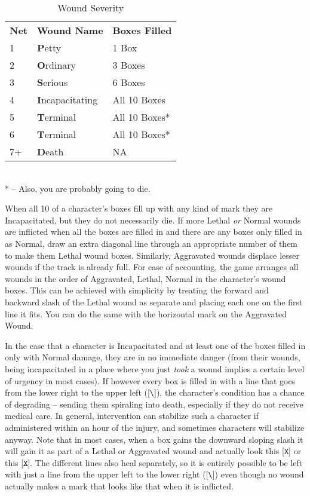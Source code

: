 \begin{wraptable}[11]{R}{8cm} \vspace{-.6cm}
 \caption{Wound Severity} \centering
\begin{tabular}{l l l}
\textbf{Net} & \textbf{Wound Name} & \textbf{Boxes Filled}\\
1 &\textbf{P}etty & 1 Box\\
2 &\textbf{O}rdinary & 3 Boxes\\
3 &\textbf{S}erious & 6 Boxes\\
4 &\textbf{I}ncapacitating & All 10 Boxes\\
5 &\textbf{T}erminal & All 10 Boxes*\\
6 &\textbf{T}erminal & All 10 Boxes*\\
7+ &\textbf{D}eath& NA\\
\end{tabular}\\
* -- Also, you are probably going to die.
\end{wraptable}

When all 10 of a character's boxes fill up with any kind of mark they are Incapacitated, but they do not necessarily die. If more Lethal \textit{or} Normal wounds are inflicted when all the boxes are filled in and there are any boxes only filled in as Normal, draw an extra diagonal line through an appropriate number of them to make them Lethal wound boxes. Similarly, Aggravated wounds displace lesser wounds if the track is already full. For ease of accounting, the game arranges all wounds in the order of Aggravated, Lethal, Normal in the character's wound boxes. This can be achieved with simplicity by treating the forward and backward slash of the Lethal wound as separate and placing each one on the first line it fits. You can do the same with the horizontal mark on the Aggravated Wound.

In the case that a character is Incapacitated and at least one of the boxes filled in only with Normal damage, they are in no immediate danger (from their wounds, being incapacitated in a place where you just \textit{took} a wound implies a certain level of urgency in most cases). If however every box is filled in with a line that goes from the lower right to the upper left ([\texttt{\textbackslash}]), the character's condition has a chance of degrading -- sending them spiraling into death, especially if they do not receive medical care. In general, intervention can stabilize such a character if administered within an hour of the injury, and sometimes characters will stabilize anyway. Note that in most cases, when a box gains the downward sloping slash it will gain it as part of a Lethal or Aggravated wound and actually look this [\texttt{X}] or this [\texttt{\sout{X}}]. The different lines also heal separately, so it is entirely possible to be left with just a line from the upper left to the lower right ([\texttt{\textbackslash}]) even though no wound actually makes a mark that looks like that when it is inflicted.

